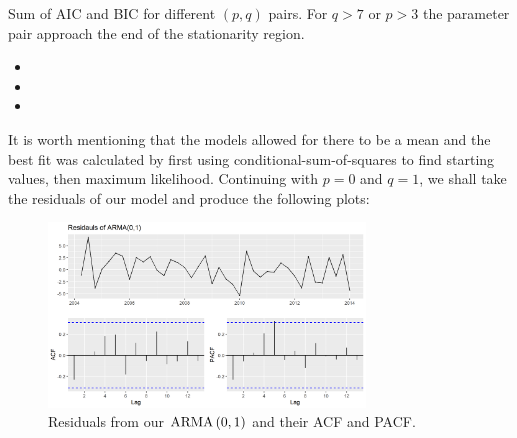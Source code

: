 \begin{table}[H]
    \begin{center}
    \end{center}
    \caption{Sum of AIC and BIC for different $(p,q)$ pairs. For $q > 7$ or $p > 3$ the parameter pair approach the end of the stationarity region.}
    \label{S2:tab_sum}
\end{table}

\begin{itemize}
    \item 
    \item 
    \item 
\end{itemize}

It is worth mentioning that the models allowed for there to be a mean and the best fit was calculated by first using conditional-sum-of-squares to find starting values, then maximum likelihood.
\nline
Continuing with $p = 0$ and $q=1$, we shall take the residuals of our model and produce the following plots:

\begin{figure}[H]
    \centering
    \includegraphics[width=0.75\textwidth]{Sections/ARIMA/Plots/manual_res.png}
    \caption{Residuals from our $\text{ARMA}\left(0,1\right)$ and their ACF and PACF.}
    \label{S2fig:manual_res}
\end{figure}